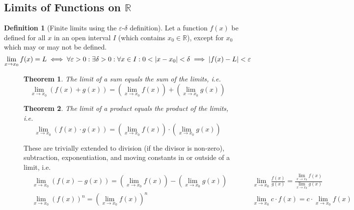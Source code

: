 \documentclass{article}
\newcommand*{\R}{\mathbb{R}}
\theoremstyle{plain}
\newtheorem{theorem}{Theorem}[section]
\numberwithin{theorem}{subsection}
\theoremstyle{definition}
\newtheorem{definition}{Definition}[section]
\numberwithin{definition}{subsection}
\theoremstyle{remark}
\numberwithin{note}{subsection}
\begin{document}
\subsection{Limits of Functions on \texorpdfstring{$\mathbb{R}$}{the Reals}}
\begin{definition}[Finite limits using the $\varepsilon$-$\delta$ definition]
    Let a function $f(x)$ be defined for all $x$ in an open interval $I$
    (which contains $x_0 \in \R$), except for $x_0$ which may or may not be defined.
    \begin{equation*}
		\lim_{x\to x_0} f(x) = L \iff \forall\varepsilon>0: \exists\delta>0: \forall x \in I: 0<\abs{x-x_0}<\delta \implies \abs{f(x)-L}<\varepsilon
	\end{equation*}
\end{definition}
%
\begin{figure}[H]
\begin{mdframed}[style=exampledefault,frametitle={Limit Laws for Functions}]
    \begin{theorem} The limit of a sum equals the sum of the limits, i.e.
        \begin{equation*}
              \lim_{x\to x_0}\left(f(x)+g(x)\right)
            = \left(\lim_{x\to x_0}f(x)\right) + \left(\lim_{x\to x_0}g(x)\right)
        \end{equation*}
    \end{theorem}
    \begin{theorem} The limit of a product equals the product of the limits, i.e.
        \begin{equation*}
          \lim_{x\to x_0}\left(f(x)\cdot g(x)\right)
        = \left(\lim_{x\to x_0}f(x)\right) \cdot \left(\lim_{x\to x_0}g(x)\right)
        \end{equation*}
    \end{theorem}
	These are trivially extended to
	division (if the divisor is non-zero),
	subtraction, exponentiation, and moving constants in or outside of a limit, i.e.
	\begin{align*}
    &\lim_{x\to x_0}\left(f(x) - g(x)\right)
        = \left(\lim_{x\to x_0}f(x)\right) - \left(\lim_{x\to x_0}g(x)\right)
    &\qquad
    &\lim_{x\to x_0}\frac{f(x)}{g(x)}
        = \frac{\lim_{x\to x_0}f(x)}{\lim_{x\to x_0}g(x)}
    \\
         &\lim_{x\to x_0}\left(f(x)\right)^n
        = \left(\lim_{x\to x_0}f(x)\right)^n
    &\qquad
    &\lim_{x\to x_0} c \cdot f(x)
        = c \cdot \lim_{x\to x_0}f(x)
	\end{align*}
\end{mdframed}
\end{figure}
\end{document}
